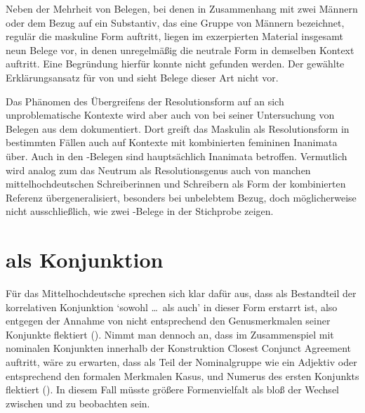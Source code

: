 Neben der Mehrheit von Belegen, bei denen in Zusammenhang mit zwei Männern oder
dem Bezug auf ein Substantiv, das eine Gruppe von Männern bezeichnet, regulär
die maskuline Form  auftritt, liegen im exzerpierten Material
insgesamt neun Belege vor, in denen unregelmäßig die neutrale Form
 in demselben Kontext auftritt. Eine Begründung hierfür konnte
nicht gefunden werden. Der gewählte Erklärungsansatz für  von \citet{wechslerzlatic2003} und \citet{wechsler2009} sieht
Belege dieser Art nicht vor.

Das Phänomen des Übergreifens der Resolutionsform auf an sich unproblematische
Kontexte wird aber auch von \citet[302]{corbett1991} bei seiner Untersuchung
von Belegen aus dem  dokumentiert. Dort greift das Maskulin als
Resolutionsform in bestimmten Fällen auch auf Kon\-texte mit kombinierten
femininen Inanimata über. Auch in den \CAO{}-Belegen sind hauptsächlich
Inanimata betroffen. Vermutlich wird analog zum  das Neutrum als
Resolutionsgenus auch von manchen
mittelhochdeutschen Schreiberinnen und Schreibern als
Form der kombinierten Referenz übergeneralisiert, besonders
bei unbelebtem Bezug, doch möglicherweise nicht ausschließlich, wie zwei
\KC-Belege in der Stichprobe zeigen.


\section{ als Konjunktion}
\label{sec:beideconj}

Für das Mittelhochdeutsche sprechen sich
\citet[626--627]{ksw2} klar dafür aus, dass  als Bestandteil der
korrelativen Konjunktion  `sowohl \dots\ als auch' in
dieser Form erstarrt ist, also  entgegen der Annahme von
\citet{askedal1974} nicht entsprechend den Genusmerkmalen
seiner Konjunkte flektiert (). Nimmt man dennoch an,
dass im Zusammenspiel mit nominalen Konjunkten innerhalb der Konstruktion
Closest Conjunct Agreement auftritt, wäre zu
erwarten, dass  als Teil der Nominalgruppe wie ein
Adjektiv oder  entsprechend den formalen
Merkmalen Kasus,  und Numerus des ersten Konjunkts flektiert
(). In diesem Fall müsste größere Formenvielfalt als bloß
der Wechsel zwischen  und
 zu beobachten sein.

